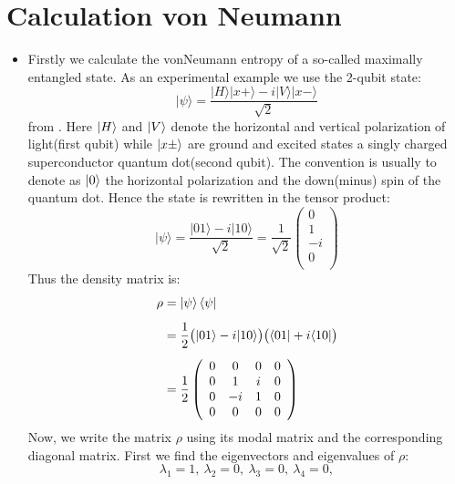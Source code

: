 \section{Calculation von Neumann}
\begin{itemize}
\item
Firstly we calculate the vonNeumann entropy of a so-called maximally entangled state. As an experimental example we use the 2-qubit state:
\begin{equation}
|\psi\rangle=\frac{|H\rangle|x+\rangle-i|V\rangle|x-\rangle}{\sqrt{2}}
\label{psivon}
\end{equation}
from \cite{PhysRevLett.110.167401}. Here $\ket{H}$ and $\ket{V}$ denote the
horizontal and vertical polarization of light(first qubit) while $\ket{x\pm}$ are ground and excited states a singly charged superconductor quantum dot(second qubit). The convention is usually to denote as $\ket{0}$ the horizontal polarization and the down(minus) spin of the quantum dot. Hence the state is rewritten in the tensor product:
\begin{equation}
|\psi\rangle=\frac{|01\rangle-i|10\rangle}{\sqrt{2}}=\frac{1}{\sqrt{2}}\left(
\begin{array}{c}
 0 \\
 1\\
 -i\\
 0 \\
\end{array}
\right)
\label{pspspsps}
\end{equation}
Thus the density matrix is:
\begin{align}
\label{rhomatrix}
\rho &= \ket{\psi} \bra{\psi} \nonumber \\[0.5em]
&=\frac{1}{2}\big{(}|01\rangle-i|10\rangle\big{)}\big{(}\langle01|+i\langle10|\big{)}\\[0.5em]
&=\frac{1}{2}\left(
\begin{array}{cccc}
 0 & 0 & 0 & 0 \\
 0 & 1 & i & 0 \\
 0 & -i & 1 & 0 \\
 0 & 0 & 0 & 0 \\
\end{array}
\right)\nonumber
\end{align}
Now, we write the matrix $\rho$ using its modal matrix and the corresponding diagonal matrix. 
First we find the eigenvectors and eigenvalues  of $\rho$:
\begin{equation}
\lambda_1=1,\:  \lambda_2=0,\:  \lambda_3=0,\:  \lambda_4=0, 
\end{equation}

\end{itemize}

